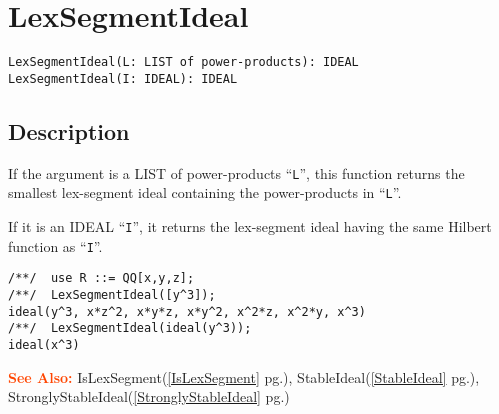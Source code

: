 \documentclass[a4paper]{mybook}
\newenvironment{command}{}{} %
\newcommand\SeeAlso{\par\textcolor{OrangeRed}{\textbf{\large See Also: }}}
\begin{document}
\section{LexSegmentIdeal}
\label{LexSegmentIdeal}
\begin{command} %


\begin{Verbatim}[label=syntax, rulecolor=\color{MidnightBlue},
frame=single]
LexSegmentIdeal(L: LIST of power-products): IDEAL
LexSegmentIdeal(I: IDEAL): IDEAL
\end{Verbatim}


\subsection*{Description}

If the argument is a LIST of power-products ``\verb&L&'', this function returns the
smallest lex-segment ideal containing the power-products in ``\verb&L&''.
\par 
If it is an IDEAL ``\verb&I&'', it returns the lex-segment ideal having the same
Hilbert function as ``\verb&I&''.
\begin{Verbatim}[label=example, rulecolor=\color{PineGreen}, frame=single]
/**/  use R ::= QQ[x,y,z];
/**/  LexSegmentIdeal([y^3]);
ideal(y^3, x*z^2, x*y*z, x*y^2, x^2*z, x^2*y, x^3)
/**/  LexSegmentIdeal(ideal(y^3));
ideal(x^3)
\end{Verbatim}


\SeeAlso %
  IsLexSegment(\ref{IsLexSegment} pg.\pageref{IsLexSegment}), 
    StableIdeal(\ref{StableIdeal} pg.\pageref{StableIdeal}), 
    StronglyStableIdeal(\ref{StronglyStableIdeal} pg.\pageref{StronglyStableIdeal})
\end{command} %
\end{document}
